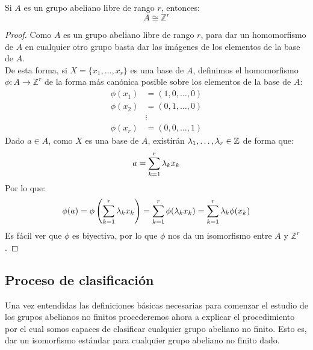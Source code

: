 
\begin{prop}
    Si $A$ es un grupo abeliano libre de rango $r$, entonces:
    \begin{equation*}
        A\cong \mathbb{Z}^r
    \end{equation*}
    \begin{proof}
        Como $A$ es un grupo abeliano libre de rango $r$, para dar un homomorfismo de $A$ en cualquier otro grupo basta dar las imágenes de los elementos de la base de $A$.\\

        \noindent
        De esta forma, si $X = \{x_1,\ldots,x_r\}$ es una base de $A$, definimos el homomorfismo $\phi:A\to \mathbb{Z}^r$ de la forma más canónica posible sobre los elementos de la base de $A$:
        \begin{align*}
            \phi(x_1) &= (1, 0, \ldots, 0) \\
            \phi(x_2) &= (0, 1, \ldots, 0) \\
                      &\vdots \\
            \phi(x_r) &= (0, 0, \ldots, 1)
        \end{align*}
        Dado $a\in A$, como $X$ es una base de $A$, existirán $\lambda_1,\ldots,\lambda_r\in \mathbb{Z}$ de forma que:
        \begin{equation*}
            a = \sum_{k=1}^{r}\lambda_kx_k
        \end{equation*}
        Por lo que:
        \begin{equation*}
            \phi(a) = \phi\left(\sum_{k=1}^{r}\lambda_kx_k\right) = \sum_{k=1}^{r}\phi(\lambda_kx_k) = \sum_{k=1}^{r}\lambda_k \phi(x_k)
        \end{equation*}
        Es fácil ver que $\phi$ es biyectiva, por lo que $\phi$ nos da un isomorfismo entre $A$ y $\mathbb{Z}^r$.
    \end{proof}
\end{prop}

\subsection{Proceso de clasificación}
\noindent
Una vez entendidas las definiciones básicas necesarias para comenzar el estudio de los grupos abelianos no finitos procederemos ahora a explicar el procedimiento por el cual somos capaces de clasificar cualquier grupo abeliano no finito. Esto es, dar un isomorfismo estándar para cualquier grupo abeliano no finito dado.\\

